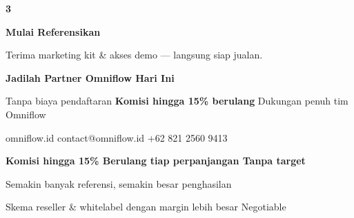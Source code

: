 \documentclass[a4paper]{article}
\begin{document}
\begin{center}
\begin{minipage}[t]{0.318\textwidth}
{\begin{minipage}[t][4.7cm][c]{\dimexpr\linewidth-2\fboxsep\relax}
            \begin{center}
                {\fontsize{22}{26}\selectfont\bfseries\color{BluePrimary} 3}
            \end{center}
            \vspace{2pt}
            \begin{center}
                {\fontsize{10}{13}\selectfont\bfseries\color{BlueDark} Mulai Referensikan}\par\vspace{3pt}
                {\fontsize{9}{12}\selectfont\color{TextDark} Terima marketing kit \& akses demo --- langsung siap jualan.}
            \end{center}
        \end{minipage}}
\end{minipage}
\end{center}

\vspace{8pt}

{\setlength{\fboxsep}{10pt}\setlength{\fboxrule}{0pt}%
\noindent\colorbox{BluePrimary}{%
    \begin{minipage}{\dimexpr\textwidth-2\fboxsep\relax}
        \centering
        {\fontsize{13}{16}\selectfont\bfseries\color{White}
        Jadilah Partner Omniflow Hari Ini}\par\vspace{3pt}
        {\fontsize{9.5}{12}\selectfont\color{BlueMid}
        Tanpa biaya pendaftaran \enspace\textbullet\enspace \textbf{Komisi hingga 15\% berulang} \enspace\textbullet\enspace Dukungan penuh tim Omniflow}\par\vspace{2pt}
        {\fontsize{9.5}{12}\selectfont\color{BlueLight}
        omniflow.id \enspace\textbullet\enspace contact@omniflow.id \enspace\textbullet\enspace +62 821 2560 9413}
    \end{minipage}}}


\vspace{6pt}

{\setlength{\fboxsep}{8pt}\setlength{\fboxrule}{0pt}%
\noindent\colorbox{BlueBg}{%
    \begin{minipage}{\dimexpr\textwidth-2\fboxsep\relax}
        \centering
        {\fontsize{9}{12}\selectfont\bfseries\color{BluePrimary}
        Komisi hingga 15\% \enspace\textbullet\enspace Berulang tiap perpanjangan \enspace\textbullet\enspace Tanpa target}\par\vspace{1pt}
        {\fontsize{8.5}{11}\selectfont\color{BlueDark}
        Semakin banyak referensi, semakin besar penghasilan}\par\vspace{1pt}
        {\fontsize{8}{10}\selectfont\color{TextLight}
        Skema reseller \& whitelabel dengan margin lebih besar \enspace\textbullet\enspace Negotiable}
    \end{minipage}}}

\restoregeometry
\pagestyle{empty}
\end{document}
